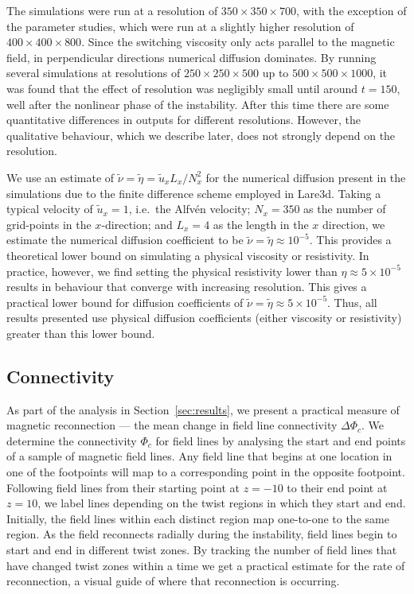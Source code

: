 The simulations were run at a resolution of $350 \times 350 \times 700$, with the exception of the parameter studies, which were run at a slightly higher resolution of $400 \times 400 \times 800$. Since the switching viscosity only acts parallel to the magnetic field, in perpendicular directions numerical diffusion dominates. By running several simulations at resolutions of $250 \times 250 \times 500$ up to $500 \times 500 \times 1000$, it was found that the effect of resolution was negligibly small until around $t=150$, well after the nonlinear phase of the instability. After this time there are some quantitative differences in outputs for different resolutions. However, the qualitative behaviour, which we describe later, does not strongly depend on the resolution.

We use an estimate of $\tilde{\nu} = \tilde{\eta} = \tilde{u}_x L_x/N_x^2$ for the numerical diffusion present in the simulations due to the finite difference scheme employed in Lare3d. Taking a typical velocity of $\tilde{u}_x = 1$, i.e.\ the Alfv\'en velocity; $N_x = 350$ as the number of grid-points in the $x$-direction; and $L_x = 4$ as the length in the $x$ direction, we estimate the numerical diffusion coefficient to be $\tilde{\nu} = \tilde{\eta} \approx 10^{-5}$. This provides a theoretical lower bound on simulating a physical viscosity or resistivity. In practice, however, we find setting the physical resistivity lower than $\eta \approx 5\times10^{-5}$ results in behaviour that  converge with increasing resolution. This gives a practical lower bound for diffusion coefficients of $\tilde{\nu} = \tilde{\eta} \approx 5 \times 10^{-5}$. Thus, all results presented use physical diffusion coefficients (either viscosity or resistivity) greater than this lower bound.

\subsection{Connectivity}

As part of the analysis in Section~\ref{sec:results}, we present a
practical measure of magnetic reconnection --- the mean change in
field line connectivity $\Delta\Phi_c$. We determine the connectivity
$\Phi_c$ for field lines by analysing the start and end points of a
sample of magnetic field lines. Any field line that begins at one
location in one of the footpoints will map to a corresponding point in
the opposite footpoint. Following field lines from their starting
point at $z=-10$ to their end point at $z=10$, we label lines
depending on the twist regions in which they start and end. Initially,
the field lines within each distinct region map one-to-one to the same
region. As the field reconnects radially during the instability, field lines
begin to start and end in different twist zones. By tracking the
number of field lines that have changed twist zones within a 
time  we get a practical estimate for the rate of
reconnection,  a visual guide of where that reconnection is
occurring. 

